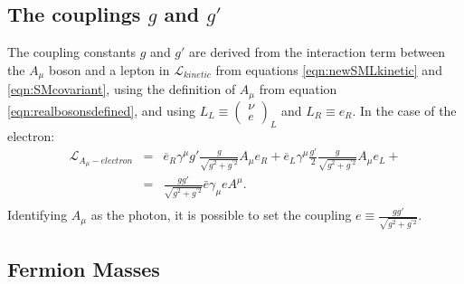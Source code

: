 \subsection{The couplings $g$ and $g'$}

The coupling constants $g$ and $g'$ are derived from the interaction term between the $A_\mu$ boson and a lepton in $\mathcal L_{kinetic}$ from equations \ref{eqn:newSMLkinetic} and \ref{eqn:SMcovariant}, using the definition of $A_\mu$ from equation \ref{eqn:realbosonsdefined}, and using $L_L \equiv \left( \begin{array}{cc} \nu \\ e \end{array}\right)_L$ and $L_R \equiv e_R$. In the case of the electron:
\begin{eqnarray}
\mathcal L_{A_\mu-electron} &=&  \overline{e}_R\gamma^\mu g' \frac{g}{\sqrt{g^2 + g^{'2}}} A_\mu e_R + \overline{e}_L\gamma^\mu \frac{g'}{2} \frac{g}{\sqrt{g^2 + g^{'2}}} A_\mu e_L + \nonumber \\
&=&  \frac{gg'}{\sqrt{g^2 + g^{'2}}}\bar{e}\gamma_\mu e A^\mu .\\
\label{eqn:ALinteraction}
\end{eqnarray}
Identifying $A_\mu$ as the photon, it is possible to set the coupling $ e \equiv \frac{gg'}{\sqrt{g^2 + g^{'2}}}$. 

\subsection{Fermion Masses}
\label{section:fermionmasses}

